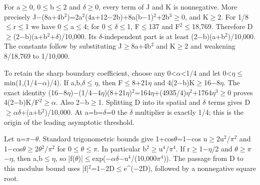 \documentclass[11pt,a4paper]{article}
\begin{document}
For a\ensuremath{\geq}0, 0\ensuremath{\leq}b\ensuremath{\leq}2 and \ensuremath{\delta}\ensuremath{\geq}0, every term of J and K is nonnegative. More precisely J\ensuremath{-}(8a+4b\ensuremath{^2})=2a\ensuremath{^2}(4a+12\ensuremath{-}2b)+8a(b\ensuremath{-}1)\ensuremath{^2}+2b\ensuremath{^3}\ensuremath{\geq}0, and K\ensuremath{\geq}2. For 1/8\ensuremath{\leq}r\ensuremath{\leq}1 we have 0\ensuremath{\leq}a\ensuremath{\leq}4; for 0\ensuremath{\leq}\ensuremath{\delta}\ensuremath{\leq}1, F\ensuremath{\leq}137 and F\ensuremath{^2}\ensuremath{\leq}18,769. Therefore D\ensuremath{\geq}(2\ensuremath{-}b)(a+b\ensuremath{^2}+\ensuremath{\delta})/10,000. Its \ensuremath{\delta}-independent part is at least (2\ensuremath{-}b)(a+b\ensuremath{^2})/10,000. The constants follow by substituting J\ensuremath{\geq}8a+4b\ensuremath{^2} and K\ensuremath{\geq}2 and weakening 8/18,769 to 1/10,000.

To retain the sharp boundary coefficient, choose any 0<\ensuremath{\alpha}<1/4 and let 0<\ensuremath{\eta}\ensuremath{\leq}min(1,(1/4\ensuremath{-}\ensuremath{\alpha})/4). If a,b,\ensuremath{\delta}\ensuremath{\leq}\ensuremath{\eta}, then F\ensuremath{\leq}8+21\ensuremath{\eta} and 4(2\ensuremath{-}b)K\ensuremath{\geq}16\ensuremath{-}8\ensuremath{\eta}. The exact identity (16\ensuremath{-}8\ensuremath{\eta})\ensuremath{-}(1/4\ensuremath{-}4\ensuremath{\eta})(8+21\ensuremath{\eta})\ensuremath{^2}=164\ensuremath{\eta}+(4935/4)\ensuremath{\eta}\ensuremath{^2}+1764\ensuremath{\eta}\ensuremath{^3}\ensuremath{\geq}0 proves 4(2\ensuremath{-}b)K/F\ensuremath{^2}\ensuremath{\geq}\ensuremath{\alpha}. Also 2\ensuremath{-}b\ensuremath{\geq}1. Splitting D into its spatial and \ensuremath{\delta} terms gives D\ensuremath{\geq}\ensuremath{\alpha}\ensuremath{\delta}+(a+b\ensuremath{^2})/10,000. At a=b=\ensuremath{\delta}=0 the \ensuremath{\delta} multiplier is exactly 1/4; this is the origin of the leading asymptotic threshold.

Let u=\ensuremath{\pi}\ensuremath{-}\ensuremath{\theta}. Standard trigonometric bounds give 1+cos\ensuremath{\theta}=1\ensuremath{-}cos u\ensuremath{\geq}2u\ensuremath{^2}/\ensuremath{\pi}\ensuremath{^2} and 1\ensuremath{-}cos\ensuremath{\theta}\ensuremath{\geq}2\ensuremath{\theta}\ensuremath{^2}/\ensuremath{\pi}\ensuremath{^2} for 0\ensuremath{\leq}\ensuremath{\theta}\ensuremath{\leq}\ensuremath{\pi}. In particular b\ensuremath{^2}\ensuremath{\geq}u\ensuremath{^4}/\ensuremath{\pi}\ensuremath{^4}. If r\ensuremath{\geq}1\ensuremath{-}\ensuremath{\eta}/2 and \ensuremath{\theta}\ensuremath{\geq}\ensuremath{\pi}\ensuremath{-}\ensuremath{\eta}, then a,b\ensuremath{\leq}\ensuremath{\eta}, so |f(\ensuremath{\theta})|\ensuremath{\leq}exp(\ensuremath{-}\ensuremath{\alpha}\ensuremath{\delta}\ensuremath{-}u\ensuremath{^4}/(10,000\ensuremath{\pi}\ensuremath{^4})). The passage from D to this modulus bound uses |f|\ensuremath{^2}=1\ensuremath{-}2D\ensuremath{\leq}e\textasciicircum{}(\ensuremath{-}2D), followed by a nonnegative square root.
\end{document}
